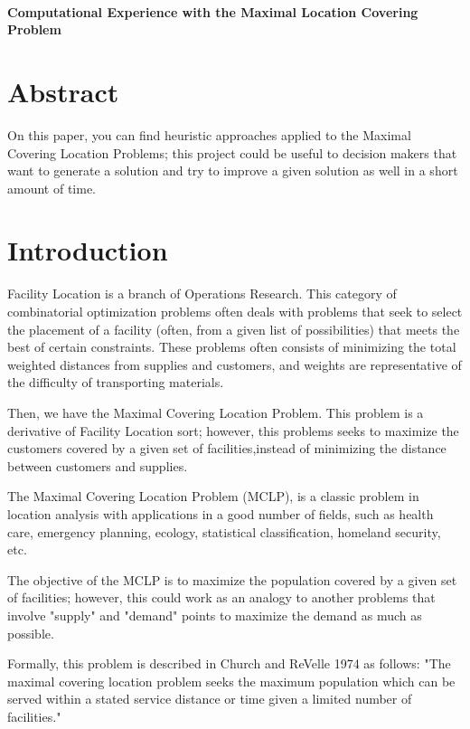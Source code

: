 \documentclass[11pt, a4paper]{article}
\newcommand{\Title}[1]{{\LARGE \centering \hrulefill\\ \textbf{#1}\\ \hrulefill}}
\begin{document}
\pagestyle{plain}


\onehalfspacing
\setcounter{page}{1}
\Title{Computational Experience with the Maximal Location Covering Problem}

\section*{Abstract}
{\small \singlespacing
	On this paper, you can find heuristic approaches applied to the Maximal Covering Location Problems; this project could be useful to decision makers that want to generate a solution and try to improve a given solution as well in a short amount of time.  
}

\section{Introduction}\label{sec:intro}
Facility Location is a branch of Operations Research. This category of combinatorial optimization problems often deals with problems that seek to select the placement of a facility (often, from a given list of possibilities) that meets the best of certain constraints. These problems often consists of minimizing the total weighted distances from supplies and customers, and weights are representative of the difficulty of transporting materials. 

Then, we have the Maximal Covering Location Problem. This problem is a derivative of Facility Location sort; however, this problems seeks to maximize the customers covered by a given set of facilities,instead of minimizing the distance between customers and supplies. 

The Maximal Covering Location Problem (MCLP), is a classic problem in location analysis with    applications in a good number of fields, such as health care, emergency planning, ecology, statistical classification, homeland security, etc.

The objective of the MCLP is to maximize the population covered by a given set of facilities; however, this could work as an analogy to another problems that involve "supply" and "demand" points to maximize the demand as much as possible.

Formally, this problem is described in Church and ReVelle 1974 \cite{church1974} as follows:
"The maximal covering location problem seeks the maximum population which can be served within a stated service distance or time given a limited number of facilities."
\end{document}
